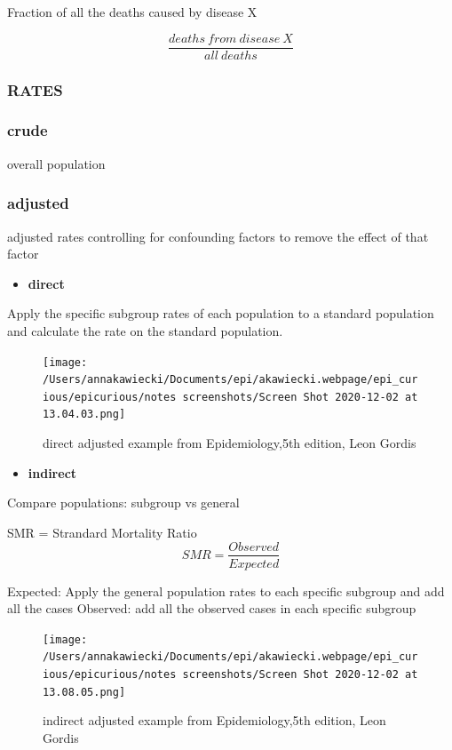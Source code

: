 \documentclass[
]{article}
\providecommand{\tightlist}{%
  \setlength{\itemsep}{0pt}\setlength{\parskip}{0pt}}
\begin{document}
Fraction of all the deaths caused by disease X

\[\frac{deaths\:from\:disease\:X}{all\:deaths}\]

\hypertarget{rates}{%
\subsubsection{RATES}\label{rates}}

\hypertarget{crude}{%
\subsubsection{crude}\label{crude}}

overall population

\hypertarget{adjusted}{%
\subsubsection{adjusted}\label{adjusted}}

adjusted rates controlling for confounding factors to remove the effect
of that factor

\begin{itemize}
\tightlist
\item
  \textbf{direct}
\end{itemize}

Apply the specific subgroup rates of each population to a standard
population and calculate the rate on the standard population.

\begin{figure}
\centering
\texttt{[image: /Users/annakawiecki/Documents/epi/akawiecki.webpage/epi\_curious/epicurious/notes screenshots/Screen Shot 2020-12-02 at 13.04.03.png]}
\caption{direct adjusted example from Epidemiology,5th edition, Leon
Gordis}
\end{figure}

\begin{itemize}
\tightlist
\item
  \textbf{indirect}
\end{itemize}

Compare populations: subgroup vs general

SMR = Strandard Mortality Ratio \[SMR= \frac{Observed}{Expected}\]

Expected: Apply the general population rates to each specific subgroup
and add all the cases Observed: add all the observed cases in each
specific subgroup

\begin{figure}
\centering
\texttt{[image: /Users/annakawiecki/Documents/epi/akawiecki.webpage/epi\_curious/epicurious/notes screenshots/Screen Shot 2020-12-02 at 13.08.05.png]}
\caption{indirect adjusted example from Epidemiology,5th edition, Leon
Gordis}
\end{figure}
\end{document}
